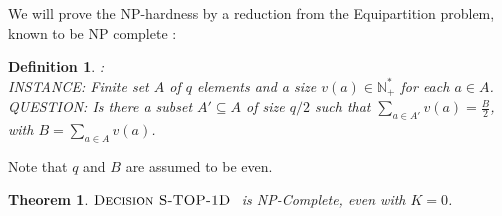 \documentclass[a4paper]{book}
\newtheorem{theorem}{Theorem}[chapter]
\newtheorem{definition}{Definition}
\newcommand{\statoned}{{\sc S-TOP-1D }}
\begin{document}
We will prove the NP-hardness by a reduction from the {\sc Equipartition} problem,  known to be {\sc NP} complete \cite{gj}:

\begin{definition} { }:\\
INSTANCE: Finite set $A$ of $q$ elements and a size $v(a) \in \mathbb{N_+^*}$ for each $a \in A$.\\
QUESTION: Is there a subset $A' \subseteq A$ of size $q/2$ such that $\sum_{a \in A'}v(a)=\frac{B}{2}$, with $B=\sum_{a \in A }v(a)$.
\end{definition}
Note that $q$ and $B$ are assumed to be even. 


\begin{theorem}
$\text{\sc{Decision} \statoned}$ is {\sc NP}-Complete, even with $K=0$.
\end{theorem}\label{theo:nphard}
\end{document}
